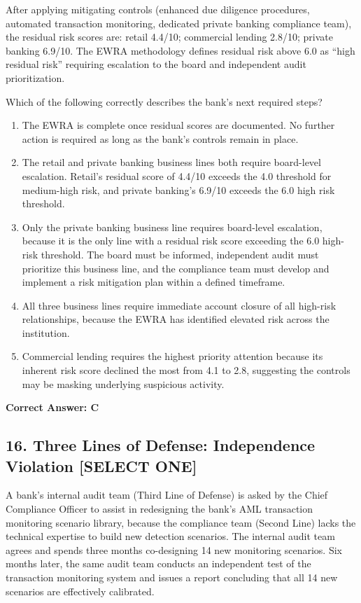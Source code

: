 \documentclass[11pt,a4paper]{article}
\begin{document}
	After applying mitigating controls (enhanced due diligence procedures, automated transaction monitoring, dedicated private banking compliance team), the residual risk scores are: retail 4.4/10; commercial lending 2.8/10; private banking 6.9/10. The EWRA methodology defines residual risk above 6.0 as ``high residual risk'' requiring escalation to the board and independent audit prioritization.
	
	Which of the following correctly describes the bank's next required steps?
	
	\begin{enumerate}[label=\Alph*.]
		\item The EWRA is complete once residual scores are documented. No further action is required as long as the bank's controls remain in place.
		\item The retail and private banking business lines both require board-level escalation. Retail's residual score of 4.4/10 exceeds the 4.0 threshold for medium-high risk, and private banking's 6.9/10 exceeds the 6.0 high risk threshold.
		\item Only the private banking business line requires board-level escalation, because it is the only line with a residual risk score exceeding the 6.0 high-risk threshold. The board must be informed, independent audit must prioritize this business line, and the compliance team must develop and implement a risk mitigation plan within a defined timeframe.
		\item All three business lines require immediate account closure of all high-risk relationships, because the EWRA has identified elevated risk across the institution.
		\item Commercial lending requires the highest priority attention because its inherent risk score declined the most from 4.1 to 2.8, suggesting the controls may be masking underlying suspicious activity.
	\end{enumerate}
	\textbf{Correct Answer: C}
	
	\subsection{16. Three Lines of Defense: Independence Violation \textnormal{[SELECT ONE]}}
	
	A bank's internal audit team (Third Line of Defense) is asked by the Chief Compliance Officer to assist in redesigning the bank's AML transaction monitoring scenario library, because the compliance team (Second Line) lacks the technical expertise to build new detection scenarios. The internal audit team agrees and spends three months co-designing 14 new monitoring scenarios. Six months later, the same audit team conducts an independent test of the transaction monitoring system and issues a report concluding that all 14 new scenarios are effectively calibrated.
	
\end{document}
